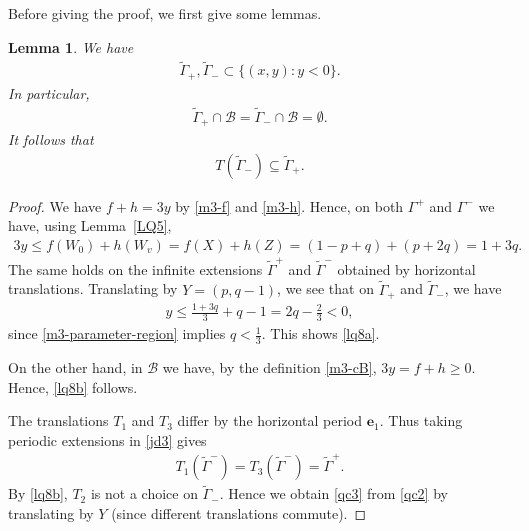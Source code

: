 \documentclass[11pt,reqno,tbtags,a4paper]{amsart}
\numberwithin{equation}{section}
\renewcommand\le{\leq}
\renewcommand\ge{\geq}
\renewcommand\leq{\leqslant}
\renewcommand\geq{\geqslant}
\theoremstyle{plain}%
\newtheorem{lemma}[theorem]{Lemma}
\theoremstyle{definition}
\theoremstyle{remark}
\newcommand{\refL}[1]{Lemma~\ref{#1}}
\newcommand\set[1]{\ensuremath{\{#1\}}}
\newcommand\gG{\Gamma}
\newcommand\cB{\mathcal B}
\newcommand\ve{\mathbf{e}}
\newcommand\tgG{\widetilde{\gG}}
\newcommand\0{{\boldsymbol 0}}
\newcommand\1{{\boldsymbol 1}}
\begin{document}
Before giving the proof, we first give some lemmas.
\begin{lemma}\label{LQ8}
We have
\begin{align}\label{lq8a}
  \tgG_+,\tgG_-\subset\set{(x,y):y<0}.
\end{align}
In particular,
\begin{align}\label{lq8b}
 \tgG_+\cap\cB=\tgG_-\cap\cB=\emptyset. 
\end{align}
It follows that
\begin{align}\label{qc3}
  T(\tgG_-)\subseteq\tgG_+.
\end{align}
\end{lemma}
\begin{proof}
  We have $f+h=3y$ by \eqref{m3-f} and \eqref{m3-h}.
Hence, on both $\gG^+$ and $\gG^-$ we have, using \refL{LQ5},
\begin{align}\label{ql1}
  3y \le f(W_0)+h(W_v)=f(X)+h(Z)=(1-p+q)+(p+2q)=1+3q.
\end{align}
The same holds on the infinite extensions $\tgG^+$ and $\tgG^-$
obtained by horizontal translations. Translating by $Y=(p,q-1)$, we see that
on $\tgG_+$ and $\tgG_-$, we have
\begin{align}\label{ql2}
  y\le \frac{1+3q}3 + q-1 = 2q -\frac{2}{3} <0,
\end{align}
since \eqref{m3-parameter-region} implies $q<\frac13$. 
This shows \eqref{lq8a}.

On the other hand, in $\cB$ we have, by the definition \eqref{m3-cB},
$3y=f+h\ge0$. Hence, \eqref{lq8b} follows.

The translations $T_1$ and $T_3$ differ by the horizontal period $\ve_1$.
Thus 
taking periodic extensions in
\eqref{jd3} gives
\begin{align}\label{qc2}
  T_1(\tgG^-)=T_3(\tgG^-)=\tgG^+.
\end{align}
By \eqref{lq8b}, $T_2$ is not a choice on $\tgG_-$.
Hence we obtain \eqref{qc3} from \eqref{qc2} by translating by $Y$
(since different translations commute).
\end{proof}
\end{document}
